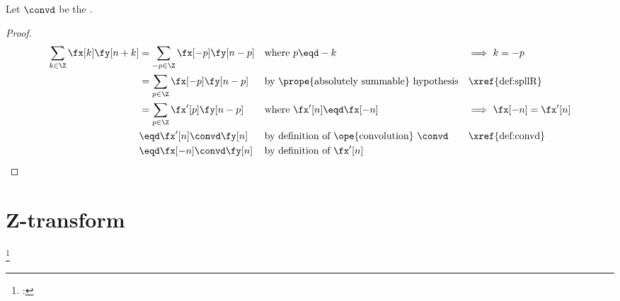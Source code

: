 \begin{proposition}
\label{prop:conv_knk}
Let $\convd$ be the  .
\end{proposition}
\begin{proof}
\begin{align*}
  \sum_{k\in\Z} \fx[k]\fy[n+k] 
    &= \sum_{-p\in\Z} \fx[-p]\fy[n-p] 
    && \text{where $p\eqd -k$}
    && \text{$\implies$ $k=-p$}
  \\&= \sum_{p\in\Z} \fx[-p]\fy[n-p] 
    && \text{by \prope{absolutely summable} hypothesis}
    && \text{\xref{def:spllR}}
  \\&= \sum_{p\in\Z} \fx'[p]\fy[n-p] 
    && \text{where $\fx'[n] \eqd\fx[-n]$}
    && \text{$\implies$ $\fx[-n]=\fx'[n]$}
  \\&\eqd \fx'[n]\convd\fy[n]
    && \text{by definition of \ope{convolution} $\convd$}
    && \text{\xref{def:convd}}
  \\&\eqd \fx[-n]\convd\fy[n]
    && \text{by definition of $\fx'[n]$}
\end{align*}
\end{proof}

\section{Z-transform}
\begin{definition}
\footnote{
  : 
  }
\label{def:opZ}
\end{definition}


